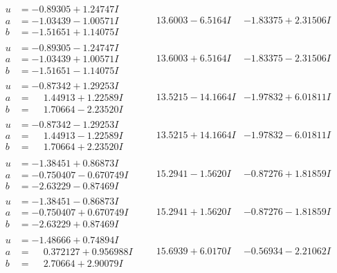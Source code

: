 \documentclass[1p]{elsarticle_modified}
\theoremstyle{definition}
\begin{document}
$$\begin{array}{c|c|c}
\begin{aligned}
u &= -0.89305 + 1.24747 I \\
a &= -1.03439 - 1.00571 I \\
b &= -1.51651 + 1.14075 I\end{aligned}
 & \phantom{-}13.6003 - 6.5164 I & -1.83375 + 2.31506 I \\ \hline\begin{aligned}
u &= -0.89305 - 1.24747 I \\
a &= -1.03439 + 1.00571 I \\
b &= -1.51651 - 1.14075 I\end{aligned}
 & \phantom{-}13.6003 + 6.5164 I & -1.83375 - 2.31506 I \\ \hline\begin{aligned}
u &= -0.87342 + 1.29253 I \\
a &= \phantom{-}1.44913 + 1.22589 I \\
b &= \phantom{-}1.70664 - 2.23520 I\end{aligned}
 & \phantom{-}13.5215 - 14.1664 I & -1.97832 + 6.01811 I \\ \hline\begin{aligned}
u &= -0.87342 - 1.29253 I \\
a &= \phantom{-}1.44913 - 1.22589 I \\
b &= \phantom{-}1.70664 + 2.23520 I\end{aligned}
 & \phantom{-}13.5215 + 14.1664 I & -1.97832 - 6.01811 I \\ \hline\begin{aligned}
u &= -1.38451 + 0.86873 I \\
a &= -0.750407 - 0.670749 I \\
b &= -2.63229 - 0.87469 I\end{aligned}
 & \phantom{-}15.2941 - 1.5620 I & -0.87276 + 1.81859 I \\ \hline\begin{aligned}
u &= -1.38451 - 0.86873 I \\
a &= -0.750407 + 0.670749 I \\
b &= -2.63229 + 0.87469 I\end{aligned}
 & \phantom{-}15.2941 + 1.5620 I & -0.87276 - 1.81859 I \\ \hline\begin{aligned}
u &= -1.48666 + 0.74894 I \\
a &= \phantom{-}0.372127 + 0.956988 I \\
b &= \phantom{-}2.70664 + 2.90079 I\end{aligned}
 & \phantom{-}15.6939 + 6.0170 I & -0.56934 - 2.21062 I \\ \hline\begin{aligned}

\end{aligned}
\end{array}$$
\end{document}

